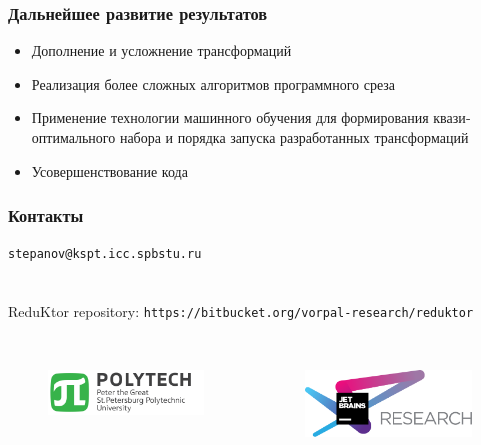 \begin{frame}
	\frametitle{Дальнейшее развитие результатов}
	\begin{itemize}
		\item Дополнение и усложнение трансформаций
		\item Реализация более сложных алгоритмов программного среза
		\item Приме­нение технологии машинного обучения для формирования квази­оптимального набора и порядка запуска разработанных трансфор­маций
		\item Усовершенствование кода
	\end{itemize}
\end{frame}



\begin{frame}[fragile]
\frametitle{Контакты}
\texttt{stepanov@kspt.icc.spbstu.ru} \\ \ \\ \ \\
ReduKtor repository: \texttt{https://bitbucket.org/vorpal-research/reduktor}
\\ \ \\ 
\begin{columns} 
	\begin{figure}
		\includegraphics[width=0.99\linewidth]{image/polytech_logo_en} 
	\end{figure}
	\begin{figure}
		\includegraphics[width=0.99\linewidth]{image/jetbrainsLogo} 
	\end{figure}
\end{columns}
\end{frame}
